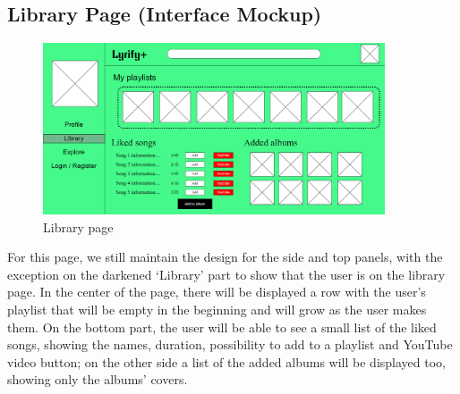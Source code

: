 \subsection{Library Page (Interface Mockup)}

\begin{figure}[h!]
\centering
\includegraphics[width=0.9\textwidth]{sections/PLL/LibraryPageMockup.png}
\caption{Library page}
\end{figure}

For this page, we still maintain the design for the side and top panels, with the exception on the darkened ‘Library’ part to show that the user is on the library page. In the center of the page, there will be displayed a row with the user’s playlist that will be empty in the beginning and will grow as the user makes them. On the bottom part, the user will be able to see a small list of the liked songs, showing the names, duration, possibility to add to a playlist and YouTube video button; on the other side a list of the added albums will be displayed too, showing only the albums’ covers. 